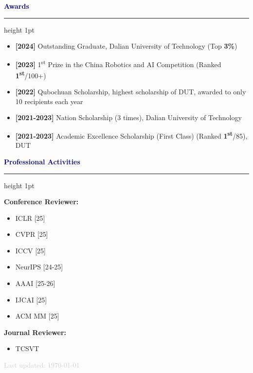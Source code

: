\documentclass[11pt, a4paper]{article}
\newcommand{\sectioncolor}[1]{\textcolor{darkblue}{#1}}
\newcommand{\secondarycolor}[1]{\textcolor{lightgray}{#1}}
\newcommand{\cvsection}[1]{
    \vspace{10pt}
    {\Large\bfseries\sectioncolor{#1}}
    \vspace{2pt}
    \hrule height 1pt
    \vspace{8pt}
}
\begin{document}
\begin{minipage}[t]{0.25\textwidth}

\vspace{-60pt} %
\begin{center}
    \fbox{\begin{minipage}{3cm}
        \centering
        \vspace{1.5cm}
        \textcolor{lightgray}{Profile Photo}
        \vspace{1.5cm}
    \end{minipage}}
\end{center}

\vspace{20pt}

\cvsection{Awards}

\begin{itemize}[leftmargin=0pt, itemsep=4pt, label={}]
    \item \textbf{[2024]}  Outstanding Graduate, Dalian University of Technology (Top \textbf{3\%})
    
    \item \textbf{[2023]}  1\textsuperscript{st} Prize in the China Robotics and AI Competition (Ranked \textbf{1\textsuperscript{st}}/100+)
    
    \item \textbf{[2022]}  Qubochuan Scholarship, highest scholarship of DUT, awarded to only 10 recipients each year
    
    \item \textbf{[2021-2023]}  Nation Scholarship (3 times), Dalian University of Technology
    
    \item \textbf{[2021-2023]}  Academic Excellence Scholarship (First Class) (Ranked \textbf{1\textsuperscript{st}}/85), DUT
\end{itemize}

\vspace{15pt}

\cvsection{Professional Activities}

\textbf{Conference Reviewer:}
\begin{itemize}[leftmargin=10pt, itemsep=2pt, label={\tiny \bullet}]
    \item ICLR [25]
    \item CVPR [25] 
    \item ICCV [25]
    \item NeurIPS [24-25]
    \item AAAI [25-26]
    \item IJCAI [25]
    \item ACM MM [25]
\end{itemize}

\vspace{8pt}

\textbf{Journal Reviewer:}
\begin{itemize}[leftmargin=10pt, itemsep=2pt, label={\tiny \bullet}]
    \item TCSVT
\end{itemize}

\end{minipage}

\vspace{20pt}

\begin{center}
    \secondarycolor{\small Last updated: \today}
\end{center}
\end{document}
